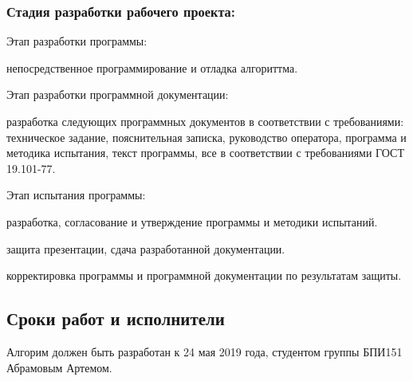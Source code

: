 \subsubsection{Стадия разработки рабочего проекта:}
\begin{my_enumerate}
\item Этап разработки программы:
    \begin{my_enumerate}
    \item непосредственное программирование и отладка алгориттма.
    \end{my_enumerate}
\item Этап разработки программной документации:
    \begin{my_enumerate}
    \item разработка следующих программных документов в соответствии с требованиями: техническое задание, пояснительная записка, руководство оператора, программа и методика испытания, текст программы, все в соответствии с требованиями ГОСТ 19.101-77.
    \end{my_enumerate}
\item Этап испытания программы:    
    \begin{my_enumerate}
    \item разработка, согласование и утверждение программы и методики испытаний.
    \item защита презентации, сдача разработанной документации.
    \item корректировка программы и программной документации по результатам защиты.
    \end{my_enumerate}
\end{my_enumerate}


\subsection{Сроки работ и исполнители}
Алгорим должен быть разработан к 24 мая 2019 года, студентом группы БПИ151 Абрамовым Артемом.
